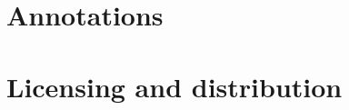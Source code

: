 \documentclass[draft]{memoir}
\begin{document}
\chapter{Annotations}
\chapter{Licensing and distribution}

\begin{comment}
\chapter{Test}
Blash \cite{GOTO} \index{b}

I have the naïvity to

\begin{ccode}
x = 1 1 +
y == -
f == x -- x 2 * +
\end{ccode}

That was...
\end{comment}

\backmatter




\printindex

\end{document}
